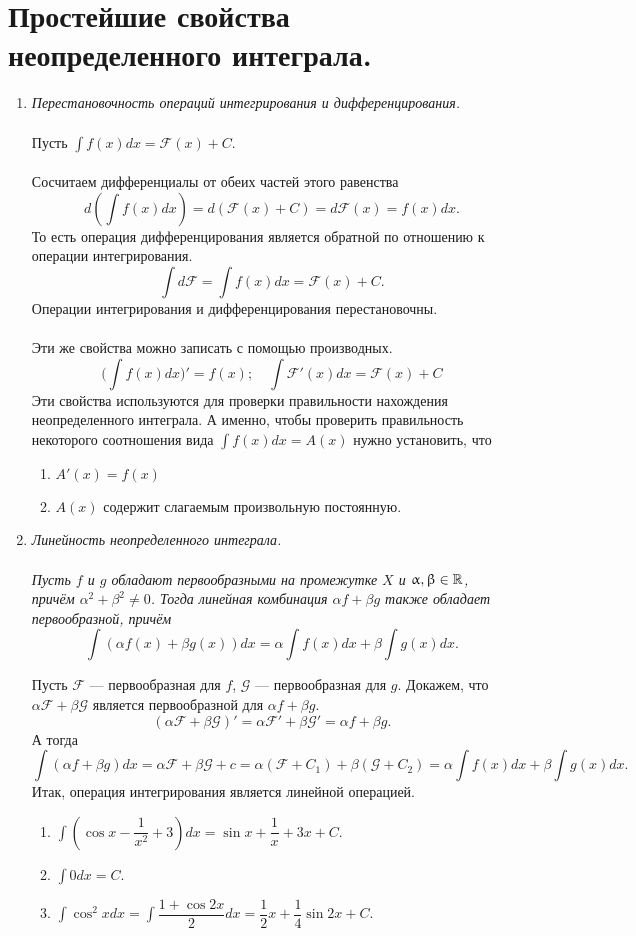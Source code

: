 \section{Простейшие свойства неопределенного интеграла.}
\begin{enumerate}
	\item \textit{Перестановочность операций интегрирования и дифференцирования.}\\\\
	Пусть $\int f(x)dx = \mathcal{F}(x) + C$.\\\\
	Сосчитаем дифференциалы от обеих частей этого равенства
	$$d(\int f(x)dx) = d(\mathcal{F}(x)+C)=d\mathcal{F}(x) = f(x)dx.$$
	То есть операция дифференцирования является обратной по отношению к операции интегрирования.
	$$\int d \mathcal{F} = \int f(x)dx = \mathcal{F}(x) + C.$$
	Операции интегрирования и дифференцирования перестановочны.\\\\
	Эти же свойства можно записать с помощью производных.
	$$\Big(\int f(x)dx\Big)' = f(x);\quad \int \mathcal{F}'(x)dx = \mathcal{F}(x) + C$$
	Эти свойства используются для проверки правильности нахождения неопределенного интеграла. А именно, чтобы проверить правильность некоторого соотношения вида
	$\int f(x)dx = A(x)$
	нужно установить, что \begin{enumerate} 
		\item $A'(x) = f(x)$
		\item $A(x)$ содержит слагаемым произвольную постоянную.
	\end{enumerate} 
	\item \textit{Линейность неопределенного интеграла.} \\\\
	\textit{Пусть $f$ и $g$ обладают первообразными на промежутке $X$ и $\upalpha, \upbeta \in \mathbb{R}$, причём $\alpha^2 + \beta^2 \neq 0$. Тогда линейная комбинация $\alpha f + \beta g$ также обладает первообразной, причём}
	$$\int (\alpha f(x) + \beta g(x))dx = \alpha \int f(x)dx + \beta \int g(x)dx.$$
	\begin{Proof}
		Пусть $\mathcal{F}$ --- первообразная для $f$, $\mathcal{G}$ --- первообразная для $g$. Докажем, что $\alpha \mathcal{F} + \beta \mathcal{G}$ является первообразной для $\alpha f + \beta g$.
		$$(\alpha \mathcal{F} + \beta \mathcal{G})'= \alpha \mathcal{F}' + \beta \mathcal{G}'= \alpha f + \beta g.$$
		А тогда $$\int (\alpha f + \beta g)dx = \alpha \mathcal{F} + \beta \mathcal{G} + c = \alpha (\mathcal{F} + C_1) + \beta(\mathcal{G} + C_2) = \alpha \int f(x)dx + \beta \int g(x)dx.$$
		Итак, операция интегрирования является линейной операцией.
	\end{Proof}
	\begin{example}\begin{enumerate}
			\item $\int (\cos x - \dfrac{1}{x^2} + 3)dx = \sin x + \dfrac{1}{x} + 3x + C.$
			\item $\int 0dx = C.$
			\item $\int \cos ^2 x dx = \int \dfrac{1 + \cos 2x}{2} dx = \dfrac{1}{2}x + \dfrac{1}{4} \sin 2x + C$.
		\end{enumerate}
	\end{example}
\end{enumerate}
